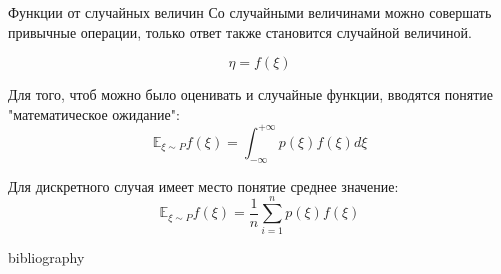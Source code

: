 \documentclass[]{beamer}
\begin{document}
\begin{frame}{Функции от случайных величин}
	Со случайными величинами можно совершать привычные операции, только ответ также становится случайной величиной.

	$$\eta = f(\xi)$$

	Для того, чтоб можно было оценивать и случайные функции, вводятся понятие "математическое ожидание":
	\begin{equation}
		\mathbb{E}_{\xi \sim P} f(\xi) = \int_{-\infty}^{+\infty} p(\xi)f(\xi)d\xi
	\end{equation}

	Для дискретного случая имеет место понятие среднее значение:
	\begin{equation}
		\mathbb{E}_{\xi \sim P} f(\xi) = \frac{1}{n} \sum_{i=1}^{n} p(\xi)f(\xi)
	\end{equation}
\end{frame}

\begin{frame}[allowframebreaks]{bibliography}
\printbibliography
\end{frame}
\end{document}
